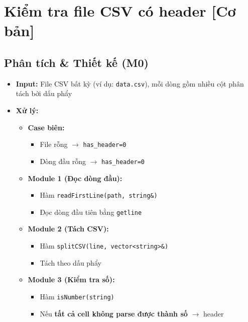 \section{Kiểm tra file CSV có header [Cơ bản]}

\subsection{Phân tích \& Thiết kế (M0)}
\begin{itemize}
    \item \textbf{Input:} File CSV bất kỳ (ví dụ: \texttt{data.csv}), mỗi dòng gồm nhiều cột phân tách bởi dấu phẩy
    
    \item \textbf{Xử lý:}
    \begin{itemize}
        \item \textbf{Case biên:}
        \begin{itemize}
            \item File rỗng $\rightarrow$ \texttt{has\_header=0}
            \item Dòng đầu rỗng $\rightarrow$ \texttt{has\_header=0}
        \end{itemize}

        \item \textbf{Module 1 (Đọc dòng đầu):}
        \begin{itemize}
            \item Hàm \texttt{readFirstLine(path, string\&)}
            \item Đọc dòng đầu tiên bằng \texttt{getline}
        \end{itemize}

        \item \textbf{Module 2 (Tách CSV):}
        \begin{itemize}
            \item Hàm \texttt{splitCSV(line, vector<string>\&)}
            \item Tách theo dấu phẩy
        \end{itemize}

        \item \textbf{Module 3 (Kiểm tra số):}
        \begin{itemize}
            \item Hàm \texttt{isNumber(string)}
            \item Nếu \textbf{tất cả cell không parse được thành số} $\rightarrow$ header
        \end{itemize}


\end{itemize}
\end{itemize}
